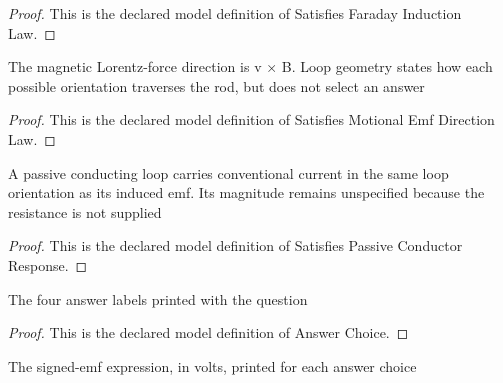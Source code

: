 \begin{proof}
  This is the declared model definition of Satisfies Faraday Induction Law.
\end{proof}
\begin{definition}
  \label{def:physics:phyx-mini-0918:phyxminiproblems-problemphyxmini0918-satisfiesmotionalemfdirectionlaw}
  The magnetic Lorentz-force direction is v × B. Loop geometry states how each possible orientation traverses the rod, but does not select an answer
\end{definition}
\begin{proof}
  This is the declared model definition of Satisfies Motional Emf Direction Law.
\end{proof}
\begin{definition}
  \label{def:physics:phyx-mini-0918:phyxminiproblems-problemphyxmini0918-satisfiespassiveconductorresponse}
  A passive conducting loop carries conventional current in the same loop orientation as its induced emf. Its magnitude remains unspecified because the resistance is not supplied
\end{definition}
\begin{proof}
  This is the declared model definition of Satisfies Passive Conductor Response.
\end{proof}
\begin{definition}
  \label{def:physics:phyx-mini-0918:phyxminiproblems-problemphyxmini0918-answerchoice}
  The four answer labels printed with the question
\end{definition}
\begin{proof}
  This is the declared model definition of Answer Choice.
\end{proof}
\begin{definition}
  \label{def:physics:phyx-mini-0918:phyxminiproblems-problemphyxmini0918-answerchoice-displayedsignedemfinvolts}
  The signed-emf expression, in volts, printed for each answer choice
\end{definition}
